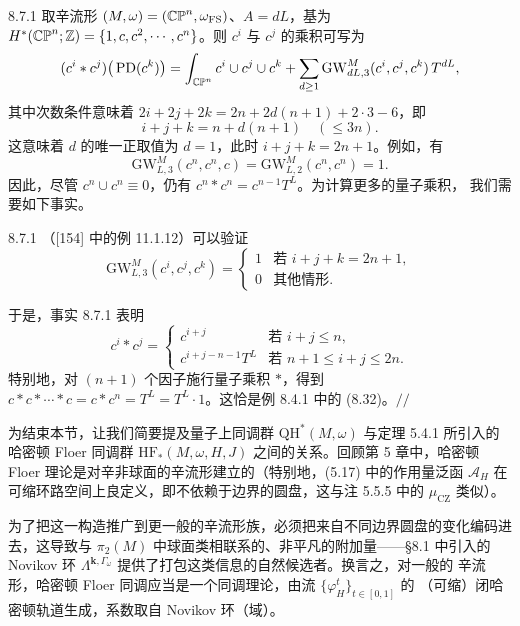 \begin{wexam}{8.7.1}
取辛流形 $(M,\omega)=(\mathbb{CP}^n,\omega_{\mathrm{FS}})$、$A=dL$，基为
$H^*(\mathbb{CP}^n;\mathbb{Z})=\{1,c,c^2,\cdots,c^n\}$。则 $c^i$ 与 $c^j$ 的乘积可写为
\[
  (c^i*c^j)\big(\operatorname{PD}(c^k)\big)
  =\int_{\mathbb{CP}^n}c^i\cup c^j\cup c^k
  +\sum_{d\ge1}\mathrm{GW}^M_{dL,3}(c^i,c^j,c^k)\,T^{dL},
\]
其中次数条件意味着 $2i+2j+2k=2n+2d(n+1)+2\cdot3-6$，即
\[
  i+j+k=n+d(n+1)\quad(\le3n).
\]
这意味着 $d$ 的唯一正取值为 $d=1$，此时 $i+j+k=2n+1$。例如，有
\[
  \mathrm{GW}^M_{L,3}(c^n,c^n,c)=\mathrm{GW}^M_{L,2}(c^n,c^n)=1 .
\]
因此，尽管 $c^n\cup c^n\equiv0$，仍有 $c^n*c^n=c^{n-1}T^L$。为计算更多的量子乘积，
我们需要如下事实。

\begin{wfact}{8.7.1}
（[154] 中的例 11.1.12）可以验证
\[
  \mathrm{GW}^M_{L,3}(c^i,c^j,c^k)=
  \begin{cases}
    1 & \text{若 } i+j+k=2n+1,\\
    0 & \text{其他情形}.
  \end{cases}
\]
\end{wfact}

于是，事实 8.7.1 表明
\[
  c^i*c^j=
  \begin{cases}
    c^{i+j} & \text{若 } i+j\le n,\\
    c^{i+j-n-1}T^L & \text{若 } n+1\le i+j\le2n .
  \end{cases}
\]
特别地，对 $(n+1)$ 个因子施行量子乘积 $*$，得到
$c*c*\cdots*c=c*c^n=T^L=T^L\cdot1$。这恰是例 8.4.1 中的 (8.32)。\hspace*{\fill}$//$
\end{wexam}

为结束本节，让我们简要提及量子上同调群 $\mathrm{QH}^*(M,\omega)$ 与定理 5.4.1 所引入的
哈密顿 Floer 同调群 $\mathrm{HF}_*(M,\omega,H,J)$ 之间的关系。回顾第 5 章中，哈密顿
Floer 理论是对辛非球面的辛流形建立的（特别地，(5.17) 中的作用量泛函
$\mathcal{A}_H$ 在可缩环路空间上良定义，即不依赖于边界的圆盘，这与注 5.5.5 中的
$\mu_{\mathrm{CZ}}$ 类似）。

为了把这一构造推广到更一般的辛流形族，必须把来自不同边界圆盘的变化编码进去，这导致与
$\pi_2(M)$ 中球面类相联系的、非平凡的附加量——§8.1 中引入的 Novikov 环
$\Lambda^{\mathbf{k},\Gamma_\omega}$ 提供了打包这类信息的自然候选者。换言之，对一般的
辛流形，哈密顿 Floer 同调应当是一个同调理论，由流 $\{\varphi_H^t\}_{t\in[0,1]}$ 的
（可缩）闭哈密顿轨道生成，系数取自 Novikov 环（域）。


